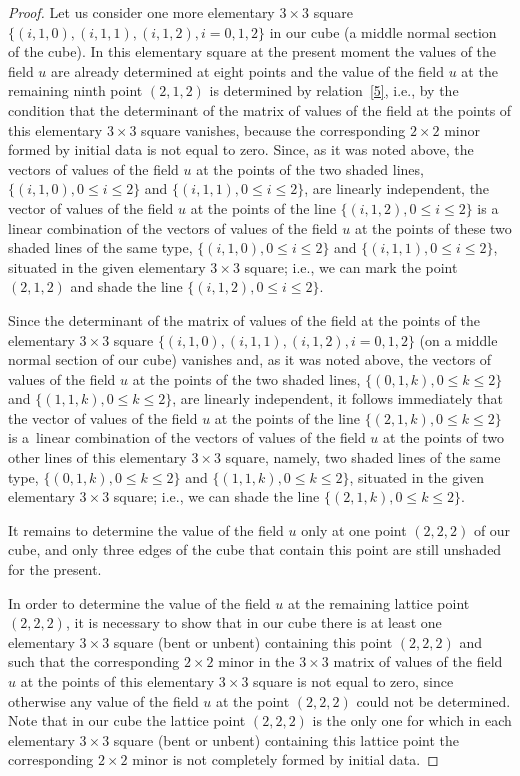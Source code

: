 \documentclass[11pt]{article}
\begin{document}
\begin{proof}
Let us consider one more elementary $3 \times 3$ square $\{(i, 1,
0), (i, 1, 1), (i, 1, 2), i = 0, 1, 2\}$ in our cube (a middle
normal section of the cube). In this elementary square at the
present moment the values of the f\/ield $u$ are already determined at
eight points and the value of the f\/ield $u$ at the remaining ninth
point $(2, 1, 2)$ is determined by relation~\eqref{5}, i.e.,
by the condition that the determinant of the matrix of values of the
f\/ield at the points of this elementary $3 \times 3$ square vanishes,
because the corresponding $2 \times 2$ minor formed by initial data
is not equal to zero. Since, as it was noted above, the vectors of
values of the f\/ield $u$ at the points of the two shaded lines,
$\{(i, 1, 0), 0 \leq i \leq 2\}$ and $\{(i, 1, 1), 0 \leq i \leq
2\}$, are linearly independent, the vector of values of the f\/ield
$u$ at the points of the line $\{(i, 1, 2), 0 \leq i \leq 2\}$ is a
linear combination of the vectors of values of the f\/ield $u$ at the
points of these two shaded lines of the same type, $\{(i, 1, 0), 0
\leq i \leq 2\}$ and $\{(i, 1, 1), 0 \leq i \leq 2\}$, situated in
the given elementary $3 \times 3$ square; i.e., we can mark the
point $(2, 1, 2)$ and shade the line $\{(i, 1, 2), 0 \leq i \leq
2\}$.




Since the determinant of the matrix of values of the f\/ield at the
points of the elementary $3 \times 3$ square $\{(i, 1, 0), (i, 1,
1), (i, 1, 2), i = 0, 1, 2\}$ (on a middle normal section of our
cube) vanishes and, as it was noted above, the vectors of values of
the f\/ield $u$ at the points of the two shaded lines, $\{(0, 1, k), 0
\leq k \leq 2\}$ and $\{(1, 1, k), 0 \leq k \leq 2\}$, are linearly
independent, it follows immediately that the vector of values of the
f\/ield $u$ at the points of the line $\{(2, 1, k), 0 \leq k \leq 2\}$
is a~linear combination of the vectors of values of the f\/ield $u$ at
the points of two other lines of this elementary $3 \times 3$
square, namely, two shaded lines of the same type, $\{(0, 1, k), 0
\leq k \leq 2\}$ and $\{(1, 1, k), 0 \leq k \leq 2\}$, situated in
the given elementary $3 \times 3$ square; i.e., we can shade the
line $\{(2, 1, k), 0 \leq k \leq 2\}$.


It remains to determine the value of the f\/ield $u$ only at one point
$(2, 2, 2)$ of our cube, and only three edges of the cube that
contain this point are still unshaded for the present.


In order to determine the value of the f\/ield $u$ at the remaining
lattice point $(2, 2, 2)$, it is necessary to show that in our cube
there is at least one elementary $3 \times 3$ square (bent or
unbent) containing this point $(2, 2, 2)$ and such that the
corresponding $2 \times 2$ minor in the $3 \times 3$ matrix of
values of the f\/ield $u$ at the points of this elementary $3 \times
3$ square is not equal to zero, since otherwise any value of the
f\/ield $u$ at the point $(2, 2, 2)$ could not be determined. Note
that in our cube the lattice point $(2, 2, 2)$ is the only one for
which in each elementary $3 \times 3$ square (bent or unbent)
containing this lattice point the corresponding $2 \times 2$ minor
is not completely formed by initial data.



\end{proof}
\end{document}
